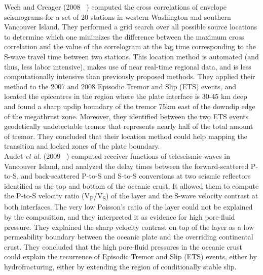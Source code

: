 \documentclass[main.tex]{subfiles}
\begin{document}
Wech and Creager (2008 ~\cite{WEC_2008}) computed the cross correlations of envelope seismograms for a set of 20 stations in western Washington and southern Vancouver Island. They performed a grid search over all possible source locations to determine which one minimizes the difference between the maximum cross correlation and the value of the correlogram at the lag time corresponding to the S-wave travel time between two stations. This location method is automated (and thus, less labor intensive), makes use of near real-time regional data, and is less computationally intensive than previously proposed methods. They applied their method to the 2007 and 2008 Episodic Tremor and Slip (ETS) events, and located the epicentres in the region where the plate interface is 30-45 km deep and found a sharp updip boundary of the tremor 75km east of the downdip edge of the megathrust zone. Moreover, they identified between the two ETS events geodetically undetectable tremor that represents nearly half of the total amount of tremor. They concluded that their location method could help mapping the transition and locked zones of the plate boundary. \\

Audet \textit{et al.} (2009 ~\cite{AUD_2009}) computed receiver functions of teleseismic waves in Vancouver Island, and analyzed the delay times between the forward-scattered P-to-S, and back-scattered P-to-S and S-to-S conversions at two seismic reflectors identified as the top and bottom of the oceanic crust. It allowed them to compute the P-to-S velocity ratio (V\textsubscript{P}/V\textsubscript{S}) of the layer and the S-wave velocity contrast at both interfaces. The very low Poisson's ratio of the layer could not be explained by the composition, and they interpreted it as evidence for high pore-fluid pressure. They explained the sharp velocity contrast on top of the layer as a low permeability boundary between the oceanic plate and the overriding continental crust. They concluded that the high pore-fluid pressures in the oceanic crust could explain the recurrence of Episodic Tremor and Slip (ETS) events, either by hydrofracturing, either by extending the region of conditionally stable slip.\\
\end{document}
